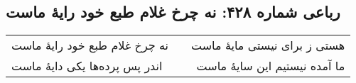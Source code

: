 \begin{center}
\section*{رباعی شماره ۴۲۸: نه چرخ غلام طبع خود رایهٔ ماست}
\label{sec:0428}
\begin{longtable}{l p{0.5cm} r}
نه چرخ غلام طبع خود رایهٔ ماست
&&
هستی ز برای نیستی مایهٔ ماست
\\
اندر پس پرده‌ها یکی دایهٔ ماست
&&
ما آمده نیستیم این سایهٔ ماست
\\
\end{longtable}
\end{center}
